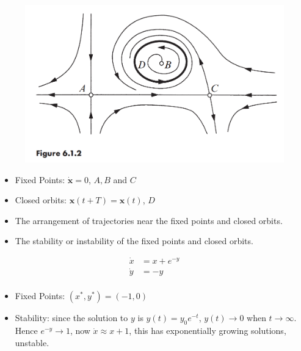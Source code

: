 \documentclass[10pt,aspectratio=43,mathserif,table]{beamer}
\begin{document}
\begin{frame}
    \begin{figure}
		\centering
		\includegraphics[width=0.7\linewidth]{f612.jpg}
	\end{figure}

    \begin{itemize}
        \item Fixed Points: $\dot{\mathbf{x}}=0$, $A, B$ and $C$
        \item Closed orbits: $\mathbf{x}(t+T)=\mathbf{x}(t)$, $D$
        \item The arrangement of trajectories near the fixed points and closed orbits.
        \item The stability or instability of the fixed points and closed orbits.
    \end{itemize}
\end{frame}

\begin{frame}
    $$
    \begin{aligned}
        \dot{x}&=x+e^{-y}\\
        \dot{y}&=-y\\
    \end{aligned}
    $$
    \begin{itemize}
        \item Fixed Points: $\left( x^*,y^* \right) =\left( -1,0 \right)$ 
        \item Stability: since the solution to $y$ is $y\left( t \right) =y_0e^{-t}$, $y\left( t \right) \rightarrow 0$ when $t\rightarrow \infty$. Hence $e^{-y} \rightarrow 1$, now $\dot{x} \approx x + 1$, this has exponentially growing solutions, unstable.
    \end{itemize}
    
\end{frame}
\end{document}
